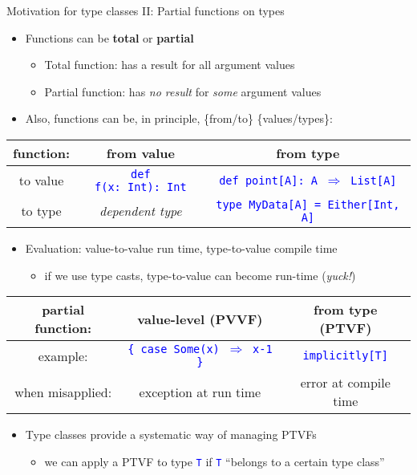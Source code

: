 \documentclass[english]{beamer}
\providecommand{\tabularnewline}{\\}
\begin{document}
\begin{frame}{Motivation for type classes II: Partial functions on types}

\begin{itemize}
\item Functions can be \textbf{total} or \textbf{partial}
\begin{itemize}
\item Total function: has a result for all argument values
\item Partial function: has \emph{no result} for \emph{some} argument values
\end{itemize}
\item Also, functions can be, in principle, \{from/to\} \{values/types\}:
\end{itemize}
\begin{center}
\begin{tabular}{|c|c|c|}
\hline 
function: &
from value &
from type\tabularnewline
\hline 
\hline 
to value &
\texttt{\textcolor{blue}{\footnotesize{}def f(x:\ Int):\ Int}} &
\texttt{\textcolor{blue}{\footnotesize{}def point{[}A{]}: A $\Rightarrow$
List{[}A{]}}}\tabularnewline
\hline 
to type &
\emph{dependent type} &
\texttt{\textcolor{blue}{\footnotesize{}type MyData{[}A{]} = Either{[}Int,
A{]}}}\tabularnewline
\hline 
\end{tabular}
\par\end{center}
\begin{itemize}
\item Evaluation: value-to-value \textendash{} run time, type-to-value \textendash{}
compile time
\begin{itemize}
\item if we use type casts, type-to-value can become run-time (\emph{yuck!})
\end{itemize}
\end{itemize}
\begin{center}
\begin{tabular}{|c|c|c|}
\hline 
partial function: &
 value-level (PVVF) &
from type (PTVF)\tabularnewline
\hline 
\hline 
example: &
\texttt{\textcolor{blue}{\footnotesize{}\{ case Some(x) $\Rightarrow$
x-1 \}}} &
\texttt{\textcolor{blue}{\footnotesize{}implicitly{[}T{]}}}\tabularnewline
\hline 
when misapplied: &
exception at run time &
error at compile time\tabularnewline
\hline 
\end{tabular}
\par\end{center}
\begin{itemize}
\item Type classes provide a systematic way of managing PTVFs
\begin{itemize}
\item we can apply a PTVF to type \texttt{\textcolor{blue}{\footnotesize{}T}}
if \texttt{\textcolor{blue}{\footnotesize{}T}} ``belongs to a certain
type class''
\end{itemize}
\end{itemize}
\end{frame}
\end{document}
